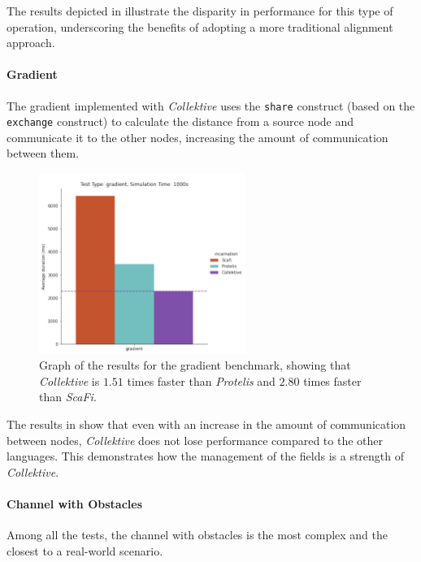 The results depicted in  illustrate the disparity in performance for this type of operation,
underscoring the benefits of adopting a more traditional alignment approach.

\paragraph{Gradient}
The gradient implemented with \emph{Collektive} uses the \texttt{share} construct (based on the \texttt{exchange} construct) to
calculate the distance from a source node and communicate it to the other nodes, increasing the amount of communication between them.

\begin{figure}[ht!]
    \centering
    \includegraphics[width=0.6\textwidth]{figures/gradient-results}
    \caption{Graph of the results for the gradient benchmark, showing that \emph{Collektive} is $1.51$ times faster
    than \emph{Protelis} and $2.80$ times faster than \emph{ScaFi}.}
    \label{fig:gradient-resutls}
\end{figure}

The results in  show that even with an increase in the amount of communication between nodes,
\emph{Collektive} does not lose performance compared to the other languages.
This demonstrates how the management of the fields is a strength of \emph{Collektive}.

\paragraph{Channel with Obstacles}
Among all the tests, the channel with obstacles is the most complex and the closest to a real-world scenario.

